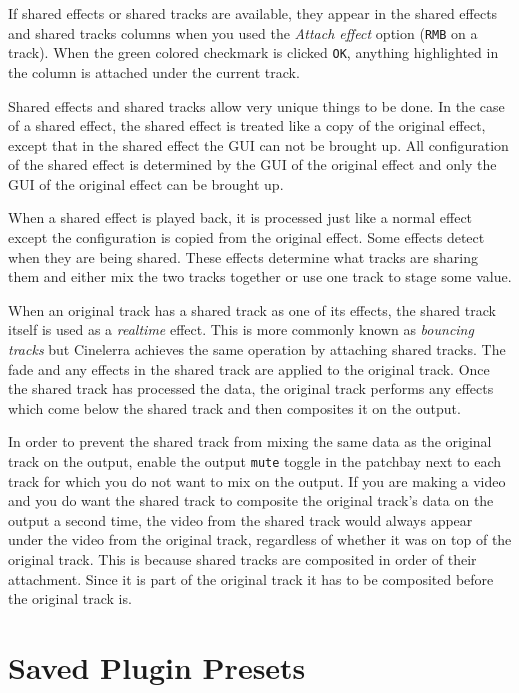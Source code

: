 If shared effects or shared tracks are available, they appear in the shared effects and shared tracks columns when you used the \textit{Attach effect} option (\texttt{RMB} on a track). When the green colored checkmark is clicked \texttt{OK}, anything highlighted in the column is attached under the current track.

Shared effects and shared tracks allow very unique things to be done. In the case of a shared effect, the shared effect is treated like a copy of the original effect, except that in the shared effect the GUI can not be brought up. All configuration of the shared effect is determined by the GUI of the original effect and only the GUI of the original effect can be brought up.

When a shared effect is played back, it is processed just like a normal effect except the configuration is copied from the original effect. Some effects detect when they are being shared. These effects determine what tracks are sharing them and either mix the two tracks together or use one track to stage some value. 

When an original track has a shared track as one of its effects, the shared track itself is used as a \textit{realtime} effect. This is more commonly known as \textit{bouncing tracks} but Cinelerra achieves the same operation by attaching shared tracks. The fade and any effects in the shared track are applied to the original track. Once the shared track has processed the data, the original track performs any effects which come below the shared track and then composites it on the output.

In order to prevent the shared track from mixing the same data as the original track on the output, enable the output \texttt{mute} toggle in the patchbay next to each track for which you do not want to mix on the output. If you are making a video and you do want the shared track to composite the original track's data on the output a second time, the video from the shared track would always appear under the video from the original track, regardless of whether it was on top of the original track. This is because shared tracks are composited in order of their attachment. Since it is part of the original track it has to be composited before the original track is.

\section{Saved Plugin Presets}%
\label{sec:saved_plugin_preset}

